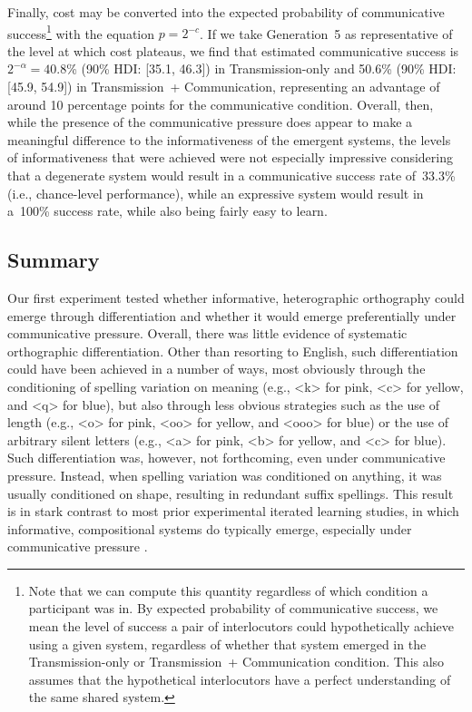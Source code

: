\documentclass[doc,biblatex]{apa7}
\begin{document}
Finally, cost may be converted into the expected probability of communicative success\footnote{Note that we can compute this quantity regardless of which condition a participant was in. By expected probability of communicative success, we mean the level of success a pair of interlocutors could hypothetically achieve using a given system, regardless of whether that system emerged in the Transmission-only or Transmission~+ Communication condition. This also assumes that the hypothetical interlocutors have a perfect understanding of the same shared system.} with the equation $p=2^{-c}$. If we take Generation~5 as representative of the level at which cost plateaus, we find that estimated communicative success is $2^{-\alpha} = 40.8$\% (90\% HDI: [35.1, 46.3]) in Transmission-only and 50.6\% (90\% HDI: [45.9, 54.9]) in Transmission~+ Communication, representing an advantage of around 10 percentage points for the communicative condition. Overall, then, while the presence of the communicative pressure does appear to make a meaningful difference to the informativeness of the emergent systems, the levels of informativeness that were achieved were not especially impressive considering that a degenerate system would result in a communicative success rate of~33.3\% (i.e., chance-level performance), while an expressive system would result in a~100\% success rate, while also being fairly easy to learn.

\subsection{Summary}

Our first experiment tested whether informative, heterographic orthography could emerge through differentiation and whether it would emerge preferentially under communicative pressure. Overall, there was little evidence of systematic orthographic differentiation. Other than resorting to English, such differentiation could have been achieved in a number of ways, most obviously through the conditioning of spelling variation on meaning (e.g., <k> for pink, <c> for yellow, and <q> for blue), but also through less obvious strategies such as the use of length (e.g., <o> for pink, <oo> for yellow, and <ooo> for blue) or the use of arbitrary silent letters (e.g., <a> for pink, <b> for yellow, and <c> for blue). Such differentiation was, however, not forthcoming, even under communicative pressure. Instead, when spelling variation was conditioned on anything, it was usually conditioned on shape, resulting in redundant suffix spellings. This result is in stark contrast to most prior experimental iterated learning studies, in which informative, compositional systems do typically emerge, especially under communicative pressure \parencite[e.g.,][]{Kirby:2015}.
\end{document}
